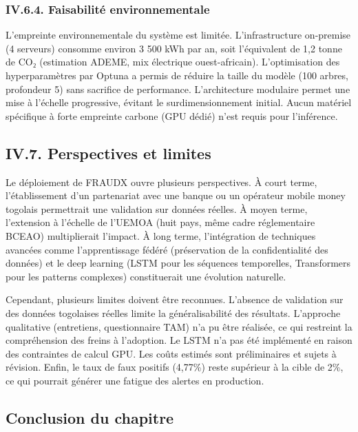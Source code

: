 \documentclass[
  12pt,
]{article}
\begin{document}
\subsubsection{IV.6.4. Faisabilité
environnementale}\label{iv.6.4.-faisabilituxe9-environnementale}

L’empreinte environnementale du système est limitée. L’infrastructure
on-premise (4 serveurs) consomme environ 3 500 kWh par an, soit
l’équivalent de 1,2 tonne de CO₂ (estimation ADEME, mix électrique
ouest-africain). L’optimisation des hyperparamètres par Optuna a permis
de réduire la taille du modèle (100 arbres, profondeur 5) sans sacrifice
de performance. L’architecture modulaire permet une mise à l’échelle
progressive, évitant le surdimensionnement initial. Aucun matériel
spécifique à forte empreinte carbone (GPU dédié) n’est requis pour
l’inférence.

\subsection{IV.7. Perspectives et
limites}\label{iv.7.-perspectives-et-limites}

Le déploiement de FRAUDX ouvre plusieurs perspectives. À court terme,
l’établissement d’un partenariat avec une banque ou un opérateur mobile
money togolais permettrait une validation sur données réelles. À moyen
terme, l’extension à l’échelle de l’UEMOA (huit pays, même cadre
réglementaire BCEAO) multiplierait l’impact. À long terme, l’intégration
de techniques avancées comme l’apprentissage fédéré (préservation de la
confidentialité des données) et le deep learning (LSTM pour les
séquences temporelles, Transformers pour les patterns complexes)
constituerait une évolution naturelle.

Cependant, plusieurs limites doivent être reconnues. L’absence de
validation sur des données togolaises réelles limite la généralisabilité
des résultats. L’approche qualitative (entretiens, questionnaire TAM)
n’a pu être réalisée, ce qui restreint la compréhension des freins à
l’adoption. Le LSTM n’a pas été implémenté en raison des contraintes de
calcul GPU. Les coûts estimés sont préliminaires et sujets à révision.
Enfin, le taux de faux positifs (4,77\%) reste supérieur à la cible de
2\%, ce qui pourrait générer une fatigue des alertes en production.

\subsection{Conclusion du chapitre}\label{conclusion-du-chapitre-3}
\end{document}
